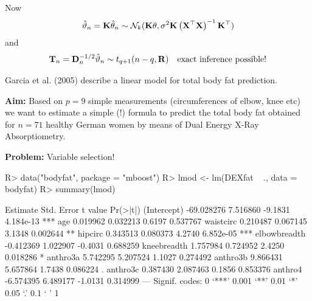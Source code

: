 \documentclass[landscape]{slides}
\begin{document}
Now
\begin{eqnarray*}
\hat{\vartheta}_n = \K \hat{\theta}_n \sim \N_k(\K \theta, \sigma^2 \K \left(\X^\top\X%
\right)^{-1} \K^\top)
\end{eqnarray*}
and
\begin{eqnarray*}
\mathbf{T}_n = \mathbf{D}_n^{-1/2} \hat{\vartheta}_n \sim t_{q+1}(n - q, \mathbf{R}) \quad \text{exact inference possible!}
\end{eqnarray*}


Garcia et al. (2005) describe a linear model
for total body fat prediction.

\textbf{Aim:} Based on $p = 9$ simple measurements (circumferences of elbow, knee etc)
we want to estimate a simple (!) formula to predict the total body fat obtained for
$n = 71$ healthy German women by means of Dual Energy X-Ray Absorptiometry. 

\textbf{Problem:} Variable selection!


\begin{Schunk}
\begin{Sinput}
R> data("bodyfat", package = "mboost")
R> lmod <- lm(DEXfat ~ ., data = bodyfat)
R> summary(lmod)
\end{Sinput}
\end{Schunk}
\begin{Schunk}
\begin{Soutput}
               Estimate Std. Error t value  Pr(>|t|)    
(Intercept)  -69.028276   7.516860 -9.1831 4.184e-13 ***
age            0.019962   0.032213  0.6197  0.537767    
waistcirc      0.210487   0.067145  3.1348  0.002644 ** 
hipcirc        0.343513   0.080373  4.2740 6.852e-05 ***
elbowbreadth  -0.412369   1.022907 -0.4031  0.688259    
kneebreadth    1.757984   0.724952  2.4250  0.018286 *  
anthro3a       5.742295   5.207524  1.1027  0.274492    
anthro3b       9.866431   5.657864  1.7438  0.086224 .  
anthro3c       0.387430   2.087463  0.1856  0.853376    
anthro4       -6.574395   6.489177 -1.0131  0.314999    
---
Signif. codes:  0 ‘***’ 0.001 ‘**’ 0.01 ‘*’ 0.05 ‘.’ 0.1 ‘ ’ 1 
\end{Soutput}
\end{Schunk}


\end{document}
